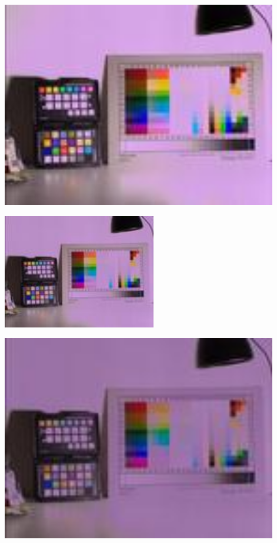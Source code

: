 \begin{center}
\includegraphics[height=9cm]{images/100ms-1ms-16-tiny}
\end{center}

\begin{center}
\includegraphics[height=5cm]{images/100ms-1ms-24-tiny}
\end{center}

\begin{center}
\includegraphics[height=9cm]{images/100ms-1ms-32-tiny}
\end{center}

